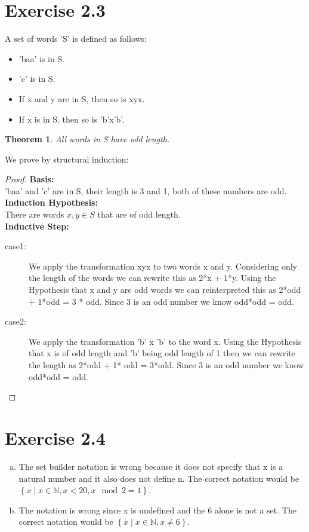 \documentclass{article} %
\newtheorem{theorem}{Theorem}
\newcommand{\homeworkNumber}{2}
\begin{document}
\section*{Exercise \homeworkNumber.3}
A set of words 'S' is defined as follows:
\begin{itemize}
	\item
		'baa' is in S.
	\item
		'c' is in S.
	\item
		If x and y are in S, then so is xyx. 
	\item
		If x is in S, then so is 'b'x'b'. 
\end{itemize}
\begin{theorem}
	All words in S have odd length.
\end{theorem}
We prove by structural induction:
\begin{proof}
	\textbf{Basis:}\\
		'baa' and 'c' are in S, their length is 3 and 1, both of these numbers are odd.\\[10pt]
	\textbf{Induction Hypothesis:}\\
		There are words $x,y \in S$ that are of odd length.\\[10pt]
	\textbf{Inductive Step:}
		\begin{description}
			\item[case1:] We apply the transformation xyx to two words x and y.
			Considering only the length of the words we can rewrite this as 2*x + 1*y.
			Using the Hypothesis that x and y are odd words we can reinterpreted this as 2*odd + 1*odd = 3 * odd.
			Since 3 is an odd number we know odd*odd = odd.
			\item[case2:] We apply the transformation 'b' x 'b' to the word x.
			Using the Hypothesis that x is of odd length and 'b' being odd length of 1 then we can rewrite the length as 2*odd + 1* odd = 3*odd.
			Since 3 is an odd number we know odd*odd = odd.
		\end{description}

\end{proof}
\newpage

\section*{Exercise \homeworkNumber.4}
\begin{enumerate}[(a)]
	\item The set builder notation is wrong because it does not specify that x is a natural number and it also does not define n.
	      The correct notation would be \(\left\{ x \mid x \in \mathbb{N}, x < 20, x \mod 2 = 1 \right\}\).
	\item The notation is wrong since x is undefined and the 6 alone is not a set.
	      The correct notation would be \( \left\{ x \mid x \in \mathbb{N}, x \neq 6 \right\} \).
\end{enumerate}
\newpage
\end{document}
